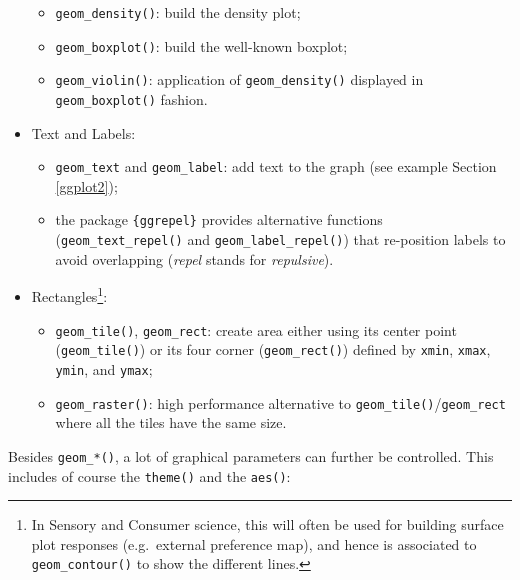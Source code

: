 \documentclass[
]{krantz}
\providecommand{\tightlist}{%
  \setlength{\itemsep}{0pt}\setlength{\parskip}{0pt}}
\begin{document}
\begin{itemize}
  \begin{itemize}
  \tightlist
  \item
    \texttt{geom\_density()}: build the density plot;
  \item
    \texttt{geom\_boxplot()}: build the well-known boxplot;
  \item
    \texttt{geom\_violin()}: application of \texttt{geom\_density()} displayed in \texttt{geom\_boxplot()} fashion.
  \end{itemize}
\item
  Text and Labels:

  \begin{itemize}
  \tightlist
  \item
    \texttt{geom\_text} and \texttt{geom\_label}: add text to the graph (see example Section \ref{ggplot2});
  \item
    the package \texttt{\{ggrepel\}} provides alternative functions (\texttt{geom\_text\_repel()} and \texttt{geom\_label\_repel()}) that re-position labels to avoid overlapping (\emph{repel} stands for \emph{repulsive}).
  \end{itemize}
\item
  Rectangles\footnote{In Sensory and Consumer science, this will often be used for building surface plot responses (e.g.~external preference map), and hence is associated to \texttt{geom\_contour()} to show the different lines.}:

  \begin{itemize}
  \tightlist
  \item
    \texttt{geom\_tile()}, \texttt{geom\_rect}: create area either using its center point (\texttt{geom\_tile()}) or its four corner (\texttt{geom\_rect()}) defined by \texttt{xmin}, \texttt{xmax}, \texttt{ymin}, and \texttt{ymax};
  \item
    \texttt{geom\_raster()}: high performance alternative to \texttt{geom\_tile()}/\texttt{geom\_rect} where all the tiles have the same size.
  \end{itemize}
\end{itemize}

Besides \texttt{geom\_*()}, a lot of graphical parameters can further be controlled. This includes of course the \texttt{theme()} and the \texttt{aes()}:
\end{document}

